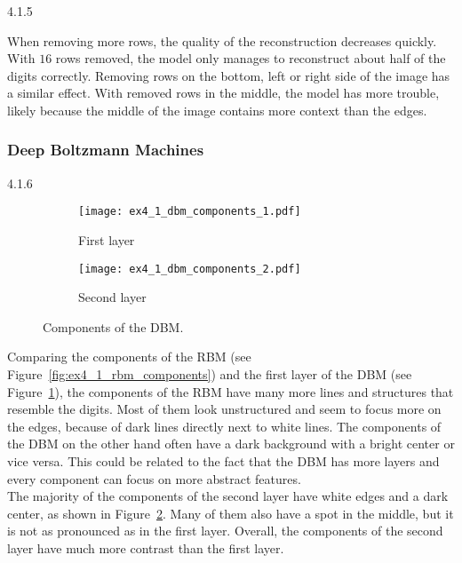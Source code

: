 \begin{task}{4.1.5}
\end{task}

When removing more rows, the quality of the reconstruction decreases quickly. With $16$ rows
removed, the model only manages to reconstruct about half of the digits correctly. Removing rows on
the bottom, left or right side of the image has a similar effect. With removed rows in the middle,
the model has more trouble, likely because the middle of the image contains more context than the
edges.

\vspace*{0.3cm}
\subsubsection*{Deep Boltzmann Machines}

\begin{task}{4.1.6}
\end{task}

\begin{figure}[ht]
  \centering
  \begin{subfigure}{0.49\textwidth}
    \texttt{[image: ex4\_1\_dbm\_components\_1.pdf]}
    \caption{First layer}
    \label{fig:ex4_1_dbm_components_1}
  \end{subfigure}
  \begin{subfigure}{0.49\textwidth}
    \texttt{[image: ex4\_1\_dbm\_components\_2.pdf]}
    \caption{Second layer}
    \label{fig:ex4_1_dbm_components_2}
  \end{subfigure}
  \caption{Components of the DBM.}
  \label{fig:ex4_1_dbm_components}
\end{figure}

Comparing the components of the RBM (see Figure~\ref{fig:ex4_1_rbm_components}) and the first layer
of the DBM (see Figure~\ref{fig:ex4_1_dbm_components_1}), the components of the RBM have many more
lines and structures that resemble the digits. Most of them look unstructured and seem to focus more
on the edges, because of dark lines directly next to white lines. The components of the DBM on the
other hand often have a dark background with a bright center or vice versa. This could be related to
the fact that the DBM has more layers and every component can focus on more abstract features.\\
The majority of the components of the second layer have white edges and a dark center, as shown in
Figure~\ref{fig:ex4_1_dbm_components_2}. Many of them also have a spot in the middle, but it is not
as pronounced as in the first layer. Overall, the components of the second layer have much more
contrast than the first layer.


